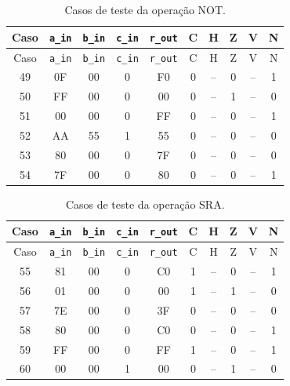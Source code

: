 \begin{longtable}{c c c c c c c c c c}
\caption{Casos de teste da operação NOT.}
\label{tab:testes-NOT}\\
\hline
Caso & \texttt{a\_in} & \texttt{b\_in} & \texttt{c\_in} & \texttt{r\_out} & C & H & Z & V & N \\ \hline
\endfirsthead
\hline
Caso & \texttt{a\_in} & \texttt{b\_in} & \texttt{c\_in} & \texttt{r\_out} & C & H & Z & V & N \\ \hline
\endhead
49 & 0F & 00 & 0 & F0 & 0 & {\footnotesize--} & 0 & {\footnotesize--} & 1 \\
50 & FF & 00 & 0 & 00 & 0 & {\footnotesize--} & 1 & {\footnotesize--} & 0 \\
51 & 00 & 00 & 0 & FF & 0 & {\footnotesize--} & 0 & {\footnotesize--} & 1 \\
52 & AA & 55 & 1 & 55 & 0 & {\footnotesize--} & 0 & {\footnotesize--} & 0 \\
53 & 80 & 00 & 0 & 7F & 0 & {\footnotesize--} & 0 & {\footnotesize--} & 0 \\
54 & 7F & 00 & 0 & 80 & 0 & {\footnotesize--} & 0 & {\footnotesize--} & 1 \\
\hline
\end{longtable}
\vspace{-0.5cm}

\begin{longtable}{c c c c c c c c c c}
\caption{Casos de teste da operação SRA.}
\label{tab:testes-SRA}\\
\hline
Caso & \texttt{a\_in} & \texttt{b\_in} & \texttt{c\_in} & \texttt{r\_out} & C & H & Z & V & N \\ \hline
\endfirsthead
\hline
Caso & \texttt{a\_in} & \texttt{b\_in} & \texttt{c\_in} & \texttt{r\_out} & C & H & Z & V & N \\ \hline
\endhead
55 & 81 & 00 & 0 & C0 & 1 & {\footnotesize--} & 0 & {\footnotesize--} & 1 \\
56 & 01 & 00 & 0 & 00 & 1 & {\footnotesize--} & 1 & {\footnotesize--} & 0 \\
57 & 7E & 00 & 0 & 3F & 0 & {\footnotesize--} & 0 & {\footnotesize--} & 0 \\
58 & 80 & 00 & 0 & C0 & 0 & {\footnotesize--} & 0 & {\footnotesize--} & 1 \\
59 & FF & 00 & 0 & FF & 1 & {\footnotesize--} & 0 & {\footnotesize--} & 1 \\
60 & 00 & 00 & 1 & 00 & 0 & {\footnotesize--} & 1 & {\footnotesize--} & 0 \\
\hline
\end{longtable}
\vspace{-0.5cm}

